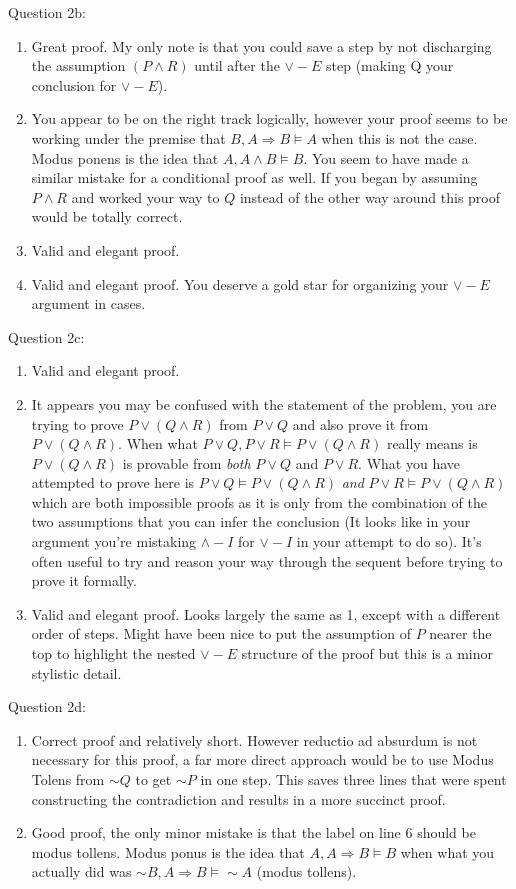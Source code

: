 \documentclass[11pt] {article}
\begin{document}
Question 2b:
\begin{enumerate}
\item Great proof. My only note is that you could save a step by not discharging the assumption $(P \land R)$ until after the $\lor -E$ step (making Q your conclusion for $\lor -E$).
\item You appear to be on the right track logically, however your proof seems to be working under the premise that $B,A\Rightarrow B \vDash A$ when this is not the case. Modus ponens is the idea that $A,A\land B \vDash B$. You seem to have made a similar mistake for a conditional proof as well. If you began by assuming $P\land R$ and worked your way to $Q$ instead of the other way around this proof would be totally correct.
\item Valid and elegant proof.
\item Valid and elegant proof.  You deserve a gold star for organizing your $\lor -E$ argument in cases.
\end{enumerate}
Question 2c:
\begin{enumerate}
\item Valid and elegant proof.
\item It appears you may be confused with the statement of the problem, you are trying to prove $P\lor (Q\land R)$ from $P \lor Q $ and also prove it from $P \lor (Q \land R)$. When what $P\lor Q, P\lor R \vDash P \lor (Q\land R)$ really means is $P\lor (Q\land R)$ is provable from \textit{both} $P\lor Q$ and $P\lor R$. What you have attempted to prove here is $P\lor Q \vDash P \lor (Q \land R)$ \textit{and} $P\lor R \vDash P \lor (Q \land R)$  which are both impossible proofs as it is only from the combination of the two assumptions that you can infer the conclusion (It looks like in your argument you're mistaking $\land-I$ for $\lor-I$ in your attempt to do so). It's often useful to try and reason your way through the sequent before trying to prove it formally.
\item Valid and elegant proof. Looks largely the same as 1, except with a different order of steps. Might have been nice to put the assumption of $P$ nearer the top to highlight the nested  $\lor -E$ structure of the proof but this is a minor stylistic detail.
\end{enumerate}
Question 2d:
\begin{enumerate}
\item Correct proof and relatively short. However reductio ad absurdum is not necessary for this proof, a far more direct approach would be to use Modus Tolens from $\sim Q$ to get $\sim P$ in one step. This saves three lines that were spent constructing the contradiction and results in a more succinct proof.
\item Good proof, the only minor mistake is that the label on line 6 should be modus tollens. Modus ponus is the idea that $A,A \Rightarrow B\vDash B$ when what you actually did was $\sim B, A \Rightarrow B \vDash \sim A$  (modus tollens).
\end{enumerate}
\end{document}

